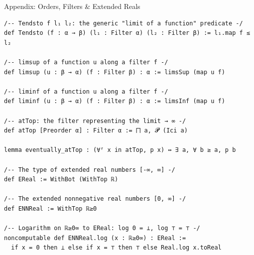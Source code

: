 \documentclass[aspectratio=169]{beamer}
\begin{document}
\begin{frame}[fragile]{Appendix: Orders, Filters \& Extended Reals}
\begin{lstlisting}[basicstyle=\ttfamily\tiny]
/-- Tendsto f l₁ l₂: the generic "limit of a function" predicate -/
def Tendsto (f : α → β) (l₁ : Filter α) (l₂ : Filter β) := l₁.map f ≤ l₂

/-- limsup of a function u along a filter f -/
def limsup (u : β → α) (f : Filter β) : α := limsSup (map u f)

/-- liminf of a function u along a filter f -/
def liminf (u : β → α) (f : Filter β) : α := limsInf (map u f)

/-- atTop: the filter representing the limit → ∞ -/
def atTop [Preorder α] : Filter α := ⨅ a, 𝓟 (Ici a)

lemma eventually_atTop : (∀ᶠ x in atTop, p x) ↔ ∃ a, ∀ b ≥ a, p b

/-- The type of extended real numbers [-∞, ∞] -/
def EReal := WithBot (WithTop ℝ)

/-- The extended nonnegative real numbers [0, ∞] -/
def ENNReal := WithTop ℝ≥0

/-- Logarithm on ℝ≥0∞ to EReal: log 0 = ⊥, log ⊤ = ⊤ -/
noncomputable def ENNReal.log (x : ℝ≥0∞) : EReal :=
  if x = 0 then ⊥ else if x = ⊤ then ⊤ else Real.log x.toReal
\end{lstlisting}
\end{frame}
\end{document}
